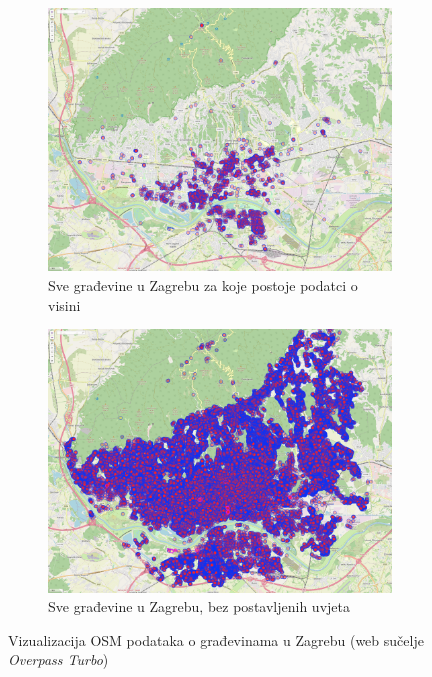 \documentclass[times, utf8, zavrsni, numeric]{fer}
\begin{document}
		\begin{figure}[ht]
			\centering
			\begin{subfigure}{.48\textwidth}
				\includegraphics[width=\linewidth,left]{figures/overpass_zagreb_all_buildings_with_height.png}
				\captionsetup{margin=.4cm}
				\caption{Sve građevine u Zagrebu za koje postoje podatci o visini}
				\label{fig:overpass_zagreb_all_buildings_with_height}
			\end{subfigure}
			\hfill
			\begin{subfigure}{.48\textwidth}
				\includegraphics[width=\linewidth,right]{figures/overpass_zagreb_all_buildings.png}
				\captionsetup{margin=.4cm}
				\caption{Sve građevine u Zagrebu, bez postavljenih uvjeta}
				\label{fig:overpass_zagreb_all_buildings}
			\end{subfigure}
			\caption{Vizualizacija OSM podataka o građevinama u Zagrebu (web sučelje \textit{Overpass Turbo})}
			\label{fig:overpass_zagreb_height_data}
		\end{figure}
	
\end{document}

